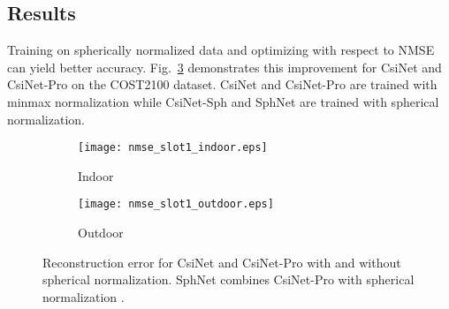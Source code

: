 \subsection{Results}
Training on spherically normalized data and optimizing with respect to NMSE can yield better accuracy. Fig.~\ref{fig:nmse_slot1} demonstrates this improvement for CsiNet and CsiNet-Pro on the COST2100 dataset. CsiNet and CsiNet-Pro are trained with minmax normalization while CsiNet-Sph and SphNet are trained with spherical normalization. %

\begin{figure}[!hbtp] \centering 
	\begin{subfigure}[t]{.45\textwidth}
		\centering
		\texttt{[image: nmse\_slot1\_indoor.eps]}
		\caption{Indoor}
		\label{fig:slot1_indoor} 
	\end{subfigure}
	\begin{subfigure}[t]{.45\textwidth}
		\centering
		\texttt{[image: nmse\_slot1\_outdoor.eps]}
		\caption{Outdoor}
		\label{fig:slot1_outdoor} 
	\end{subfigure}
	\caption{Reconstruction error for CsiNet \cite{ref:csinet} and CsiNet-Pro with and without spherical normalization. SphNet combines CsiNet-Pro with spherical normalization \cite{ref:liu2020sphnet}.}
	\label{fig:nmse_slot1} 
\end{figure}
